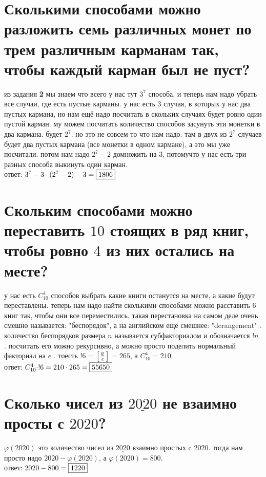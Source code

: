\documentclass{article}
\newcommand{\range}{\underline}
\newcommand{\Cnk}[2]{C_{#1}^{#2}}
\renewcommand{\f}{\frac}
\renewcommand{\l}{\left}
\renewcommand{\r}{\right}
\begin{document}
  \section{Сколькими способами можно разложить семь различных монет по трем различным карманам так, чтобы каждый карман был не пуст?}
  из задания \textbf{2} мы знаем что всего у нас тут $3^7$ способа, и теперь нам надо убрать все случаи, где есть пустые карманы.
  у нас есть $3$ случая, в которых у нас два пустых кармана, но нам ещё надо посчитать в скольких случаях будет ровно один пустой карман.
  му можем посчитать количество способов засунуть эти монетки в два кармана. будет $2^7$. но это не совсем то что нам надо.
  там в двух из $2^7$ случаев будет два пустых кармана (все монетки в одном кармане), а это мы уже посчитали.
  потом нам надо $2^7-2$ домножить на $3$, потомучто у нас есть три разных способа выкинуть один карман. \\
  ответ: $3^7 - 3 \cdot (2^7-2) - 3 = \fbox{1806}$

  \section{Скольким способами можно переставить $10$ стоящих в ряд книг, чтобы ровно $4$ из них остались на месте?}
  у нас есть $\Cnk{10}{4}$ способов выбрать какие книги останутся на месте, а какие будут переставлены.
  теперь нам надо найти сколькими способами можно расставить $6$ книг так, чтобы они все переместились.
  такая перестановка на самом деле очень смешно называется: "{}беспорядок"{}, а на английском ещё смешнее: "{}derangement"{} \cite{der}.
  количество беспорядков размера $n$ называется субфакториалом и обозначается $!n$ \cite{sub}.
  посчитать его можно рекурсивно, а можно просто поделить нормальный факториал на $e$ \cite{sub}.
  тоесть $!6 = \l[\f{6!}{e}\r] = 265$, а $\Cnk{10}{4} = 210$. \\
  ответ: $\Cnk{10}{4} \cdot !6 = 210 \cdot 265 = \fbox{55650}$

  \section{Сколько чисел из $\range{2020}$ не взаимно просты с $2020$?}
  $\varphi(2020)$ это количество чисел из $\range{2020}$ взаимно простых c $2020$.
  тогда нам просто надо $2020 - \varphi(2020)$, а $\varphi(2020) = 800$. \\
  ответ: $ 2020 - 800 = \fbox{1220} $
\end{document}
